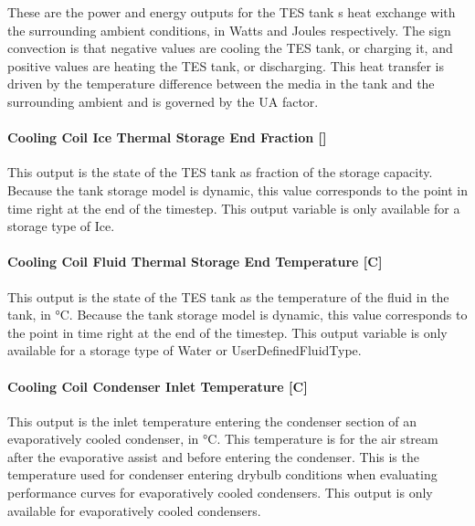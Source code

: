 These are the power and energy outputs for the TES tank s heat exchange with the surrounding ambient conditions, in Watts and Joules respectively. The sign convection is that negative values are cooling the TES tank, or charging it, and positive values are heating the TES tank, or discharging. This heat transfer is driven by the temperature difference between the media in the tank and the surrounding ambient and is governed by the UA factor.

\paragraph{\texorpdfstring{Cooling Coil Ice Thermal Storage End Fraction {[]}}{Cooling Coil Ice Thermal Storage End Fraction }}\label{cooling-coil-ice-thermal-storage-end-fraction}

This output is the state of the TES tank as fraction of the storage capacity. Because the tank storage model is dynamic, this value corresponds to the point in time right at the end of the timestep. This output variable is only available for a storage type of Ice.

\paragraph{Cooling Coil Fluid Thermal Storage End Temperature {[}C{]}}\label{cooling-coil-fluid-thermal-storage-end-temperature-c}

This output is the state of the TES tank as the temperature of the fluid in the tank, in °C. Because the tank storage model is dynamic, this value corresponds to the point in time right at the end of the timestep. This output variable is only available for a storage type of Water or UserDefinedFluidType.

\paragraph{Cooling Coil Condenser Inlet Temperature {[}C{]}}\label{cooling-coil-condenser-inlet-temperature-c-2}

This output is the inlet temperature entering the condenser section of an evaporatively cooled condenser, in °C. This temperature is for the air stream after the evaporative assist and before entering the condenser. This is the temperature used for condenser entering drybulb conditions when evaluating performance curves for evaporatively cooled condensers. This output is only available for evaporatively cooled condensers.


